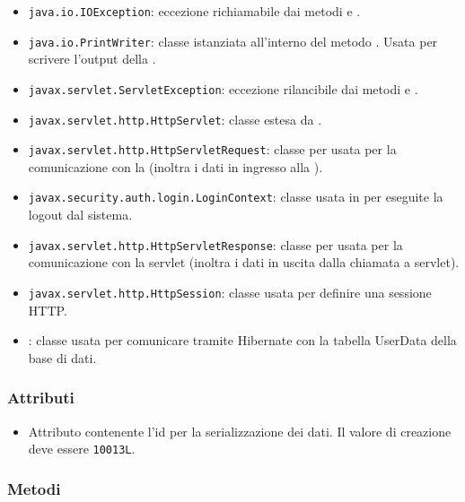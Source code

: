 \begin{itemize}
	\item \texttt{java.io.IOException}: eccezione richiamabile dai metodi  e .
	\item \texttt{java.io.PrintWriter}: classe istanziata all'interno del metodo . Usata per scrivere l'output della .
	\item \texttt{javax.servlet.ServletException}: eccezione rilancibile dai metodi  e .
	\item \texttt{javax.servlet.http.HttpServlet}: classe estesa da .
	\item \texttt{javax.servlet.http.HttpServletRequest}:  classe per usata per la comunicazione con la  (inoltra i dati in ingresso alla ).
	\item \texttt{javax.security.auth.login.LoginContext}: classe usata in  per eseguite la logout dal sistema.
	\item \texttt{javax.servlet.http.HttpServletResponse}: classe per usata per la comunicazione con la servlet (inoltra i dati in uscita dalla chiamata a servlet).
	\item \texttt{javax.servlet.http.HttpSession}: classe usata per definire una sessione HTTP.
	\item {}: classe usata per comunicare tramite Hibernate con la tabella UserData della base di dati.
\end{itemize}

\subsubsection*{Attributi}

\begin{itemize}
	\item{}
	Attributo contenente l'id per la serializzazione dei dati. Il valore di creazione deve essere \texttt{10013L}.
\end{itemize}

\subsubsection*{Metodi}

